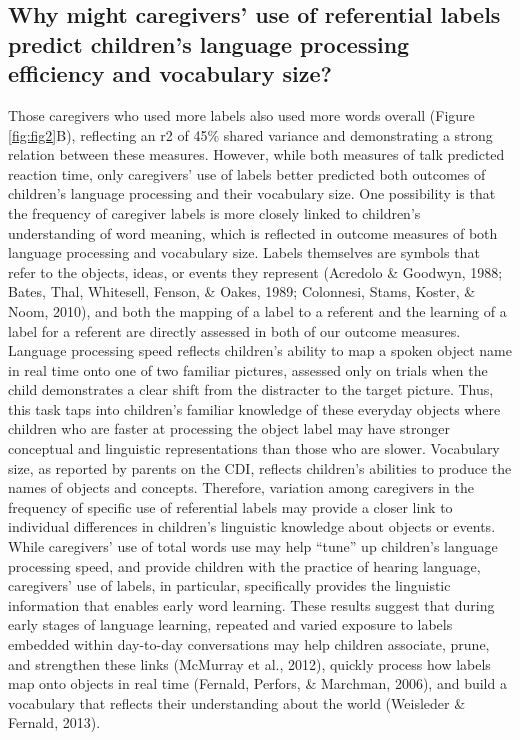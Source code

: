 \documentclass[
  english,
  man,floatsintext]{apa6}
\begin{document}
\hypertarget{why-might-caregivers-use-of-referential-labels-predict-childrens-language-processing-efficiency-and-vocabulary-size}{%
\subsection{Why might caregivers' use of referential labels predict children's language processing efficiency and vocabulary size?}\label{why-might-caregivers-use-of-referential-labels-predict-childrens-language-processing-efficiency-and-vocabulary-size}}

Those caregivers who used more labels also used more words overall (Figure \ref{fig:fig2}B), reflecting an r2 of 45\% shared variance and demonstrating a strong relation between these measures. However, while both measures of talk predicted reaction time, only caregivers' use of labels better predicted both outcomes of children's language processing and their vocabulary size. One possibility is that the frequency of caregiver labels is more closely linked to children's understanding of word meaning, which is reflected in outcome measures of both language processing and vocabulary size. Labels themselves are symbols that refer to the objects, ideas, or events they represent (Acredolo \& Goodwyn, 1988; Bates, Thal, Whitesell, Fenson, \& Oakes, 1989; Colonnesi, Stams, Koster, \& Noom, 2010), and both the mapping of a label to a referent and the learning of a label for a referent are directly assessed in both of our outcome measures. Language processing speed reflects children's ability to map a spoken object name in real time onto one of two familiar pictures, assessed only on trials when the child demonstrates a clear shift from the distracter to the target picture. Thus, this task taps into children's familiar knowledge of these everyday objects where children who are faster at processing the object label may have stronger conceptual and linguistic representations than those who are slower. Vocabulary size, as reported by parents on the CDI, reflects children's abilities to produce the names of objects and concepts. Therefore, variation among caregivers in the frequency of specific use of referential labels may provide a closer link to individual differences in children's linguistic knowledge about objects or events. While caregivers' use of total words use may help \enquote{tune} up children's language processing speed, and provide children with the practice of hearing language, caregivers' use of labels, in particular, specifically provides the linguistic information that enables early word learning. These results suggest that during early stages of language learning, repeated and varied exposure to labels embedded within day-to-day conversations may help children associate, prune, and strengthen these links (McMurray et al., 2012), quickly process how labels map onto objects in real time (Fernald, Perfors, \& Marchman, 2006), and build a vocabulary that reflects their understanding about the world (Weisleder \& Fernald, 2013).
\end{document}
